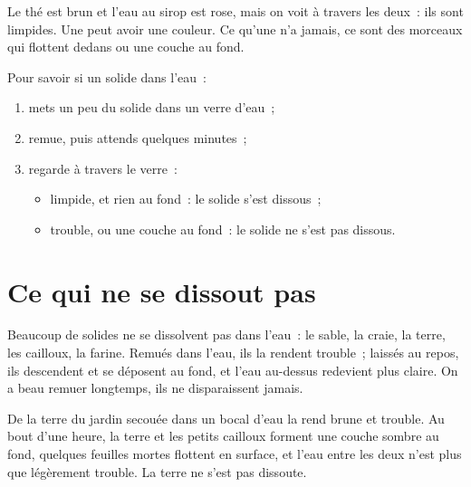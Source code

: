 \begin{remark}\label{rem:g2:mixing-and-dissolving:clear}
Le thé est brun et l'eau au sirop est rose, mais on voit à travers les
deux~: ils sont limpides. Une  peut avoir une couleur. Ce
qu'une  n'a jamais, ce sont des morceaux qui flottent dedans ou
une couche au fond.
\end{remark}

\begin{method}\label{met:g2:mixing-and-dissolving:test}
Pour savoir si un solide  dans l'eau~:
\begin{enumerate}
  \item mets un peu du solide dans un verre d'eau~;
  \item remue, puis attends quelques minutes~;
  \item regarde à travers le verre~:
    \begin{itemize}
      \item limpide, et rien au fond~: le solide s'est dissous~;
      \item trouble, ou une couche au fond~: le solide ne s'est pas
            dissous.
    \end{itemize}
\end{enumerate}
\end{method}

\section{Ce qui ne se dissout pas}

\begin{proposition}\label{prop:g2:mixing-and-dissolving:not}
Beaucoup de solides ne se dissolvent pas dans l'eau~: le sable, la
craie, la terre, les cailloux, la farine. Remués dans l'eau, ils la
rendent trouble~; laissés au repos, ils descendent et se déposent au
fond, et l'eau au-dessus redevient plus claire. On a beau remuer
longtemps, ils ne disparaissent jamais.
\end{proposition}

\begin{example}\label{ex:g2:mixing-and-dissolving:mud}
De la terre du jardin secouée dans un bocal d'eau la rend brune et
trouble. Au bout d'une heure, la terre et les petits cailloux forment
une couche sombre au fond, quelques feuilles mortes flottent en
surface, et l'eau entre les deux n'est plus que légèrement trouble. La
terre ne s'est pas dissoute.
\end{example}

